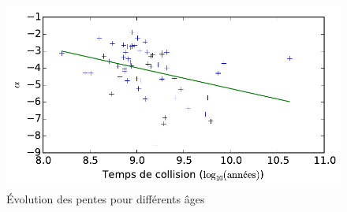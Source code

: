 
				\begin{figure}[h!]
					\centering \includegraphics[scale=0.4]{graphe/pente_tc.pdf}
					\caption{Évolution des pentes pour différents âges}
					\label{Pente-lin_dim}
				\end{figure}

